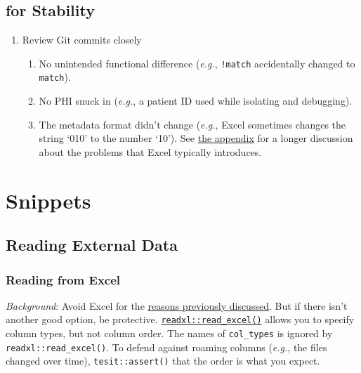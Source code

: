 \documentclass[
]{book}
\providecommand{\tightlist}{%
  \setlength{\itemsep}{0pt}\setlength{\parskip}{0pt}}
\begin{document}
\hypertarget{git-stability}{%
\section{for Stability}\label{git-stability}}

\begin{enumerate}
\def\labelenumi{\arabic{enumi}.}
\item
  Review Git commits closely

  \begin{enumerate}
  \def\labelenumii{\arabic{enumii}.}
  \tightlist
  \item
    No unintended functional difference (\emph{e.g.}, \texttt{!match} accidentally changed to \texttt{match}).
  \item
    No PHI snuck in (\emph{e.g.}, a patient ID used while isolating and debugging).
  \item
    The metadata format didn't change (\emph{e.g.}, Excel sometimes changes the string `010' to the number `10'). See \protect\hyperlink{snippets-correspondence-excel}{the appendix} for a longer discussion about the problems that Excel typically introduces.
  \end{enumerate}
\end{enumerate}

\hypertarget{snippets}{%
\chapter{Snippets}\label{snippets}}

\hypertarget{snippets-reading}{%
\section{Reading External Data}\label{snippets-reading}}

\hypertarget{snippets-reading-excel}{%
\subsection{Reading from Excel}\label{snippets-reading-excel}}

\emph{Background}: Avoid Excel for the \href{\%7B\#data-containers-avoid}{reasons previously discussed}. But if there isn't another good option, be protective. \href{https://readxl.tidyverse.org/reference/read_excel.html}{\texttt{readxl::read\_excel()}} allows you to specify column types, but not column order. The names of \texttt{col\_types} is ignored by \texttt{readxl::read\_excel()}. To defend against roaming columns (\emph{e.g.}, the files changed over time), \texttt{tesit::assert()} that the order is what you expect.
\end{document}
